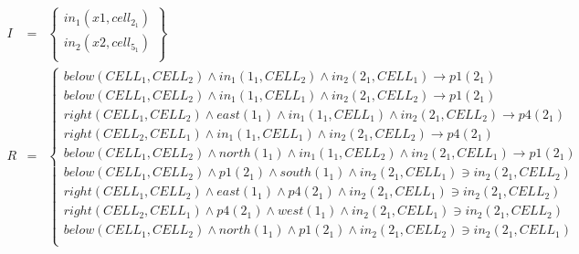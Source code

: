 \begin{eqnarray*}
I & = & \left\{ \begin{array}{l}
\mathit{in}_1(\mathit{x}1,\mathit{cell}_2_1)\\
\mathit{in}_2(\mathit{x}2,\mathit{cell}_5_1)\\
\end{array}\right\}\\
R & = &  \left\{ \begin{array}{l}
\mathit{below}(\mathit{CELL}_1,\mathit{CELL}_2) \wedge \mathit{in}_1(\mathit{}1_1,\mathit{CELL}_2) \wedge \mathit{in}_2(\mathit{}2_1,\mathit{CELL}_1) \rightarrow \mathit{p}1(\mathit{}2_1)\\
\mathit{below}(\mathit{CELL}_1,\mathit{CELL}_2) \wedge \mathit{in}_1(\mathit{}1_1,\mathit{CELL}_1) \wedge \mathit{in}_2(\mathit{}2_1,\mathit{CELL}_2) \rightarrow \mathit{p}1(\mathit{}2_1)\\
\mathit{right}(\mathit{CELL}_1,\mathit{CELL}_2) \wedge \mathit{east}(\mathit{}1_1) \wedge \mathit{in}_1(\mathit{}1_1,\mathit{CELL}_1) \wedge \mathit{in}_2(\mathit{}2_1,\mathit{CELL}_2) \rightarrow \mathit{p}4(\mathit{}2_1)\\
\mathit{right}(\mathit{CELL}_2,\mathit{CELL}_1) \wedge \mathit{in}_1(\mathit{}1_1,\mathit{CELL}_1) \wedge \mathit{in}_2(\mathit{}2_1,\mathit{CELL}_2) \rightarrow \mathit{p}4(\mathit{}2_1)\\
\mathit{below}(\mathit{CELL}_1,\mathit{CELL}_2) \wedge \mathit{north}(\mathit{}1_1) \wedge \mathit{in}_1(\mathit{}1_1,\mathit{CELL}_2) \wedge \mathit{in}_2(\mathit{}2_1,\mathit{CELL}_1) \rightarrow \mathit{p}1(\mathit{}2_1)\\
\mathit{below}(\mathit{CELL}_1,\mathit{CELL}_2) \wedge \mathit{p}1(\mathit{}2_1) \wedge \mathit{south}(\mathit{}1_1) \wedge \mathit{in}_2(\mathit{}2_1,\mathit{CELL}_1) \ni \mathit{in}_2(\mathit{}2_1,\mathit{CELL}_2)\\
\mathit{right}(\mathit{CELL}_1,\mathit{CELL}_2) \wedge \mathit{east}(\mathit{}1_1) \wedge \mathit{p}4(\mathit{}2_1) \wedge \mathit{in}_2(\mathit{}2_1,\mathit{CELL}_1) \ni \mathit{in}_2(\mathit{}2_1,\mathit{CELL}_2)\\
\mathit{right}(\mathit{CELL}_2,\mathit{CELL}_1) \wedge \mathit{p}4(\mathit{}2_1) \wedge \mathit{west}(\mathit{}1_1) \wedge \mathit{in}_2(\mathit{}2_1,\mathit{CELL}_1) \ni \mathit{in}_2(\mathit{}2_1,\mathit{CELL}_2)\\
\mathit{below}(\mathit{CELL}_1,\mathit{CELL}_2) \wedge \mathit{north}(\mathit{}1_1) \wedge \mathit{p}1(\mathit{}2_1) \wedge \mathit{in}_2(\mathit{}2_1,\mathit{CELL}_2) \ni \mathit{in}_2(\mathit{}2_1,\mathit{CELL}_1)\\

\end{array}
\end{eqnarray*}
